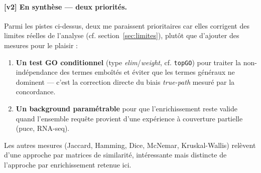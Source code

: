 \documentclass[a4paper,11pt,openright]{report}
\begin{document}
\paragraph{[v2] En synthèse --- deux priorités.} Parmi les pistes ci-dessus, deux me paraissent prioritaires car elles corrigent des limites réelles de l'analyse (cf. section~\ref{sec:limites}), plutôt que d'ajouter des mesures pour le plaisir :
\begin{enumerate}
\item \textbf{Un test GO conditionnel} (type \textit{elim}/\textit{weight}, cf. \texttt{topGO}) pour traiter la non-indépendance des termes emboîtés et éviter que les termes généraux ne dominent --- c'est la correction directe du biais \textit{true-path} mesuré par la concordance.
\item \textbf{Un background paramétrable} pour que l'enrichissement reste valide quand l'ensemble requête provient d'une expérience à couverture partielle (puce, RNA-seq).
\end{enumerate}
Les autres mesures (Jaccard, Hamming, Dice, McNemar, Kruskal-Wallis) relèvent d'une approche par matrices de similarité, intéressante mais distincte de l'approche par enrichissement retenue ici.
\end{document}

